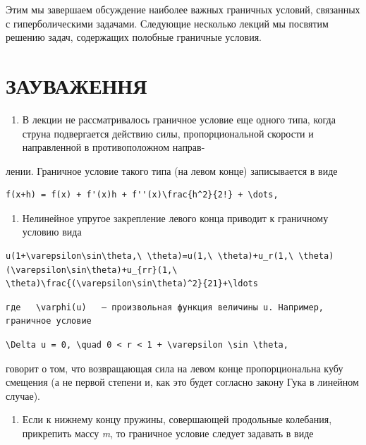 \documentclass[
  ukrainian,
]{article}
\providecommand{\tightlist}{%
  \setlength{\itemsep}{0pt}\setlength{\parskip}{0pt}}
\begin{document}
Этим мы завершаем обсуждение наиболее важных граничных условий,
связанных с гиперболическими задачами. Следующие несколько лекций мы
посвятим решению задач, содержащих полобные граничные условия.

\section{ЗАУВАЖЕННЯ}\label{ux437ux430ux443ux432ux430ux436ux435ux43dux43dux44f-2}

\begin{enumerate}
\def\labelenumi{\arabic{enumi}.}
\tightlist
\item
  В лекции не рассматривалось граничное условие еще одного типа, когда
  струна подвергается действию силы, пропорциональной скорости и
  направленной в противоположном направ-
\end{enumerate}

лении. Граничное условие такого типа (на левом конце) записывается в
виде

\begin{verbatim}
f(x+h) = f(x) + f'(x)h + f''(x)\frac{h^2}{2!} + \dots,
\end{verbatim}

\begin{enumerate}
\def\labelenumi{\arabic{enumi}.}
\setcounter{enumi}{1}
\tightlist
\item
  Нелинейное упругое закрепление левого конца приводит к граничному
  условию вида
\end{enumerate}

\begin{verbatim}
u(1+\varepsilon\sin\theta,\ \theta)=u(1,\ \theta)+u_r(1,\ \theta)(\varepsilon\sin\theta)+u_{rr}(1,\ \theta)\frac{(\varepsilon\sin\theta)^2}{21}+\ldots
\end{verbatim}

\begin{verbatim}
где   \varphi(u)   — произвольная функция величины u. Например, граничное условие
\end{verbatim}

\begin{verbatim}
\Delta u = 0, \quad 0 < r < 1 + \varepsilon \sin \theta,
\end{verbatim}

говорит о том, что возвращающая сила на левом конце пропорциональна кубу
смещения (а не первой степени и, как это будет согласно закону Гука в
линейном случае).

\begin{enumerate}
\def\labelenumi{\arabic{enumi}.}
\setcounter{enumi}{2}
\tightlist
\item
  Если к нижнему концу пружины, совершающей продольные колебания,
  прикрепить массу \emph{m}, то граничное условие следует задавать в
  виде
\end{enumerate}
\end{document}
